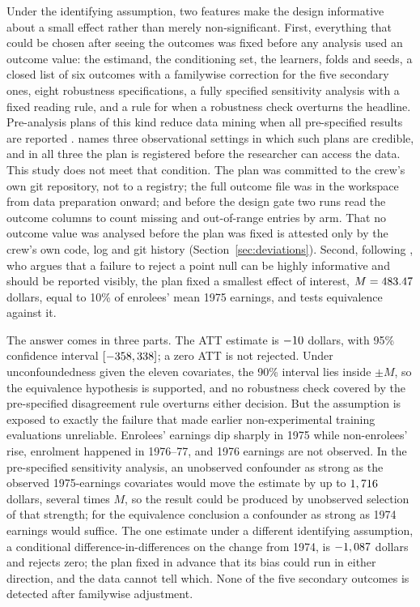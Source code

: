 \documentclass[11pt]{article}
\newcommand{\ci}[2]{$[#1, #2]$}
\begin{document}
Under the identifying assumption, two features make the design informative about a small
effect rather than merely non-significant. First, everything that could be chosen after
seeing the outcomes was fixed before any analysis used an outcome value: the estimand, the conditioning set, the learners, folds and
seeds, a closed list of six outcomes with a familywise correction for the five secondary
ones, eight robustness specifications, a fully specified sensitivity analysis with a fixed
reading rule, and a rule for when a robustness check overturns the headline. Pre-analysis
plans of this kind reduce data mining when all pre-specified results are reported
\citep{casey2012,olken2015}. \citet{burlig2018} names three observational settings in which
such plans are credible, and in all three the plan is registered before the researcher can
access the data. This study does not meet that condition. The plan was committed to the
crew's own git repository, not to a registry; the full outcome file was in the workspace
from data preparation onward; and before the design gate two runs read the outcome columns
to count missing and out-of-range entries by arm. That no outcome value was analysed before
the plan was fixed is attested only by the crew's own code, log and git history
(Section~\ref{sec:deviations}). Second, following
\citet{abadie2020}, who argues that a failure to reject a point null can be highly
informative and should be reported visibly, the plan fixed a smallest effect of interest,
$M = 483.47$ dollars, equal to 10\% of enrolees' mean 1975 earnings, and tests
equivalence against it.

The answer comes in three parts. The ATT estimate is $-10$ dollars, with 95\%
confidence interval \ci{\PrimaryCILow}{\PrimaryCIHigh}; a zero ATT is not rejected. Under
unconfoundedness given the eleven covariates, the 90\% interval lies inside $\pm M$, so the
equivalence hypothesis is supported, and no robustness check covered by the pre-specified
disagreement rule overturns either decision. But the assumption is exposed to exactly the failure that
made earlier non-experimental training evaluations unreliable. Enrolees' earnings dip
sharply in 1975 while non-enrolees' rise, enrolment happened in 1976--77, and 1976 earnings
are not observed. In the pre-specified sensitivity analysis, an unobserved confounder as
strong as the observed 1975-earnings covariates would move the estimate by up to
$1,716$ dollars, several times $M$, so the result could be produced
by unobserved selection of that strength; for the equivalence conclusion a confounder as
strong as 1974 earnings would suffice. The one estimate under a different identifying
assumption, a conditional difference-in-differences on the change from 1974, is
$-1,087$ dollars and rejects zero; the plan fixed in advance that its bias
could run in either direction, and the data cannot tell which. None of the five secondary
outcomes is detected after familywise adjustment.
\end{document}
